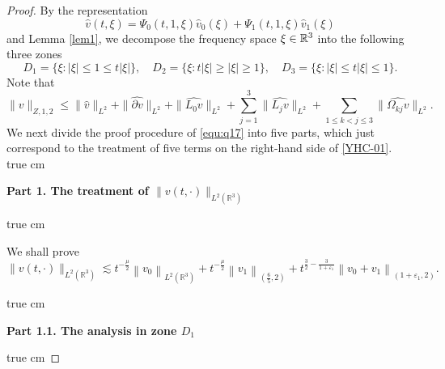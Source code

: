 \documentclass[11pt,twoside]{article}
\newcommand{\R}{\mathbb R}
\newcommand{\p}{\partial}
\newcommand{\f}{\frac}
\theoremstyle{plain}
\theoremstyle{definition}
\theoremstyle{remark}
\numberwithin{equation}{section}
\begin{document}
\begin{proof}
By the representation
\begin{equation}\label{formula}
\hat{v}(t, \xi)=\Psi_{0}(t, 1, \xi) \hat{v}_{0}(\xi)+\Psi_{1}(t, 1, \xi) \hat{v}_{1}(\xi)
\end{equation}
and Lemma \ref{lem1}, we decompose the frequency space $\xi\in\Bbb R^3$ into the following three zones
\begin{equation}\label{equ:q19}
D_1=\{\xi: |\xi| \leq 1 \leq t|\xi|\}, \quad D_2=\{\xi: t|\xi|\geq|\xi|\ge 1\}, \quad D_3=\{\xi: |\xi|\leq t|\xi| \leq 1\}.
\end{equation}
Note that
\begin{equation}\label{YHC-01}
\|v\|_{Z, 1, 2} \leq \|\hat{v}\|_{L^2}+\|\hat{\p v}\|_{L^2}+\|\widehat{L_0v}\|_{L^2}
+\sum_{j=1}^3\|\widehat{L_jv}\|_{L^2}+\sum_{1\leq k<j\leq3}\|\widehat{\Omega_{kj}v}\|_{L^2}.
\end{equation}
We next divide the proof procedure of \eqref{equ:q17} into five parts, which just correspond to the treatment of five terms
on the right-hand side of \eqref{YHC-01}.
 true cm

{\bf Part 1.  The treatment  of $\|v(t, \cdot)\|_{L^2(\R^3)}$ }

 true cm

We shall prove
\begin{equation}\label{equ:q18}
\|v(t, \cdot)\|_{L^2(\R^3)} \lesssim t^{-\f{\mu}{2}}\left\|v_0\right\|_{L^2(\R^3)}
+t^{-\f{\mu}{2}}\left\|v_1\right\|_{(\f{6}{5}, 2)}
+t^{\f{3}{2}-\f{3}{1+\varepsilon_1}}\left\|v_0+v_1\right\|_{(1+\varepsilon_1, 2)}.
\end{equation}

 true cm

{\bf Part 1.1.  The analysis  in zone $D_1$}

 true cm



\end{proof}
\end{document}
